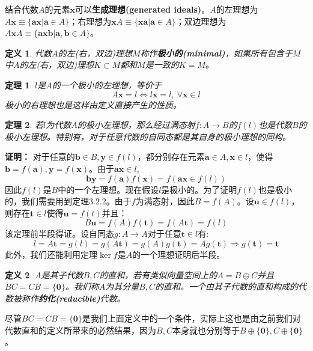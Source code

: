 \documentclass[mathserif,hyperref,UTF8,openany,b5paper]{ctexbook}
\newtheorem{defn}{定义}[section]
\newtheorem{thm}{定理}[section]
\begin{document}
结合代数$A$的元素$\mathbf{x}$可以\textbf{生成理想(generated ideals)}。$A$的左理想为$A\mathbf{x}\equiv\{\mathbf{ax}|\mathbf{a}\in A\}$；右理想为$\mathbf{x}A\equiv\{\mathbf{xa}|\mathbf{a}\in A\}$；双边理想为$A\mathbf{x}A\equiv\{\mathbf{axb}|\mathbf{a,b}\in A\}$。
\begin{defn}
    代数$A$的左(右，双边)理想$M$称作\textbf{极小的(minimal)}，如果所有包含于$M$中$A$的左(右，双边)理想$K\subset M$都和$M$是一致的$K=M$。
\end{defn}
\begin{thm}
    $l$是$A$的一个极小的左理想，等价于
    \begin{equation}
        A\mathbf{x}=l\Leftrightarrow l\mathbf{x}=l,\ \forall \mathbf{x}\in l
    \end{equation}
    极小的右理想也是这样由定义直接产生的性质。
\end{thm}
\begin{thm}
    若$l$为代数$A$的极小左理想，那么经过满态射$f:A\xrightarrow{}B$的$f(l)$也是代数$B$的极小左理想。特别有，对于任意代数的自同态都是其自身的极小理想的同构。
\end{thm}
\textbf{证明：}
对于任意的$\mathbf{b}\in B,\mathbf{y}\in f(l)$，都分别存在元素$\mathbf{a}\in A,\mathbf{x}\in l$，使得$\mathbf{b}=f(\mathbf{a}),\mathbf{y}=f(\mathbf{x})$。由于$\mathbf{ax}\in l$,
\begin{equation}
    \mathbf{by}=f(\mathbf{a})f(\mathbf{x})=f(\mathbf{ax}\in f(l))
\end{equation}
因此$f(l)$是$B$中的一个左理想。现在假设$l$是极小的。为了证明$f(l)$也是极小的，我们需要用到定理3.2.2。由于$f$为满态射，因此$B=f(A)$。设$\mathbf{u}\in f(l)$，则存在$\mathbf{t}\in l$使得$\mathbf{u}=f(t)$并且：
\begin{equation}
    B\mathbf{u}=f(A)f(\mathbf{t})=f(A\mathbf{t})=f(l)
\end{equation}
该定理前半段得证。设自同态$g:A\xrightarrow{}A$对于任意$\mathbf{t}\in l$有:
\begin{equation}
    l=A\mathbf{t}=g(l)=g(A\mathbf{t})=g(A)g(\mathbf{t})=Ag(\mathbf{t})\Rightarrow g(\mathbf{t})=\mathbf{t}
\end{equation} 
此外，我们还能利用定理$\ker f$是$A$的一个理想证明后半段。
\begin{defn}
    $A$是其子代数$B,C$的直和，若有类似向量空间上的$A=B\oplus C$并且$BC=CB=\{\mathbf{0}\}$。我们称$A$为其分量$B,C$的直和。一个由其子代数的直和构成的代数被称作\textbf{约化(reducible)}代数。
\end{defn}
尽管$BC=CB=\{\mathbf{0}\}$是我们上面定义中的一个条件，实际上这也是由之前我们对代数直和的定义所带来的必然结果，因为$B,C$本身就也分别等于$B\oplus\{\mathbf{0}\},C\oplus\{\mathbf{0}\}$。
\end{document}
